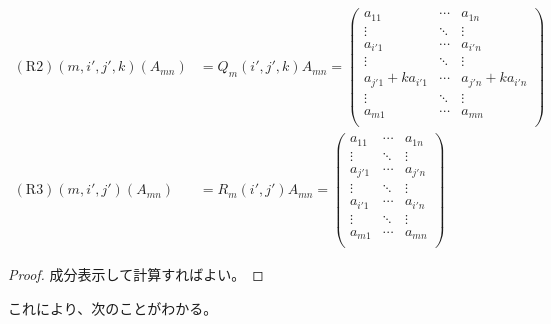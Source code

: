 \documentclass[dvipdfmx]{jsarticle}
\begin{document}
\begin{thm}
\begin{align*}
(\mathrm{R2})\left( m,i',j',k \right)\left( A_{mn} \right) &= Q_{m}\left( i',j',k \right)A_{mn} = \begin{pmatrix}
a_{11} & \cdots & a_{1n} \\
 \vdots & \ddots & \vdots \\
a_{i'1} & \cdots & a_{i'n} \\
 \vdots & \ddots & \vdots \\
a_{j'1} + ka_{i'1} & \cdots & a_{j'n} + ka_{i'n} \\
 \vdots & \ddots & \vdots \\
a_{m1} & \cdots & a_{mn} \\
\end{pmatrix}\\
(\mathrm{R3})\left( m,i',j' \right)\left( A_{mn} \right) &= R_{m}\left( i',j' \right)A_{mn} = \begin{pmatrix}
a_{11} & \cdots & a_{1n} \\
 \vdots & \ddots & \vdots \\
a_{j'1} & \cdots & a_{j'n} \\
 \vdots & \ddots & \vdots \\
a_{i'1} & \cdots & a_{i'n} \\
 \vdots & \ddots & \vdots \\
a_{m1} & \cdots & a_{mn} \\
\end{pmatrix}
\end{align*}
\end{thm}
\begin{proof}
成分表示して計算すればよい。
\end{proof}\par
これにより、次のことがわかる。
\end{document}
